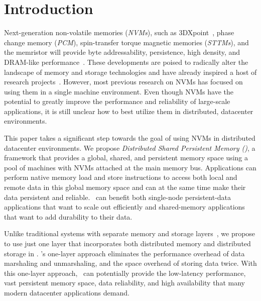 \section{Introduction}
\label{sec:introduction}

Next-generation non-volatile memories ({\em NVMs}), 
such as 3DXpoint~\cite{Intel3DXpoint}, 
phase change memory ({\em PCM}),
spin-transfer torque magnetic memories ({\em STTMs}),  and the memristor
will provide byte addressability, persistence, high density, and DRAM-like performance~\cite{NVMDB}.
These developments are poised to radically alter the landscape of memory and storage technologies
and have already inspired a host of research 
projects~\cite{Bailey10-OSImpl,Coburn11-ASPLOS, sosp09:bpfs, Dulloor14-EuroSys, hotos09:mogul, Volos11-ASPLOS, Xiaojian11-SC,Zhang15-Mojim,Octopus}.
However, most previous research on NVMs has focused on using them in a single machine environment.
Even though NVMs have the potential to greatly improve the performance and reliability of large-scale applications,
it is still unclear how to best utilize them in distributed, datacenter environments. 

This paper takes a significant step towards the goal of using NVMs in distributed datacenter environments.
We propose {\em Distributed Shared Persistent Memory (\dsnvm)},
a framework that provides a global, shared, and persistent memory space 
using a pool of machines with NVMs attached at the main memory bus.
Applications can perform native memory load and store instructions to access both local and remote data in this global memory space 
and can at the same time make their data persistent and reliable.
\dsnvm\ can benefit both single-node persistent-data applications that want to scale out efficiently
and shared-memory applications that want to add durability to their data.

Unlike traditional systems with separate memory and storage layers~\cite{Larchant,Perdis00,Larchant94,PerDis},
we propose to use just one layer that incorporates both distributed memory and 
distributed storage in \dsnvm.
\dsnvm's one-layer approach eliminates the performance overhead of data marshaling and unmarshaling,
and the space overhead of storing data twice. 
With this one-layer approach, \dsnvm\ can potentially provide the low-latency performance, 
vast persistent memory space, data reliability, and high availability
that many modern datacenter applications demand. 


